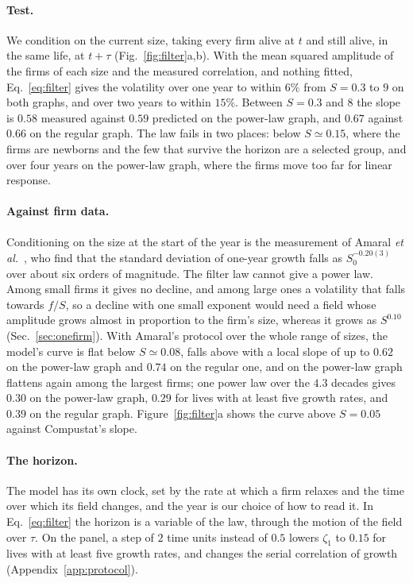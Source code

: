 \documentclass[pre,twocolumn,superscriptaddress,nofootinbib]{revtex4-2}
\begin{document}
\paragraph{Test.}  We condition on the current size, taking every firm alive at $t$ and still alive, in the same
life, at $t+\tau$ (Fig.~\ref{fig:filter}a,b).  With the mean squared amplitude of the firms of each size and the
measured correlation, and nothing fitted, Eq.~\eqref{eq:filter} gives the volatility over one year to within $6\%$
from $S=0.3$ to $9$ on both graphs, and over two years to within $15\%$.  Between $S=0.3$ and $8$ the slope is $0.58$
measured against $0.59$ predicted on the power-law graph, and $0.67$ against $0.66$ on the regular graph.  The law
fails in two places: below $S\simeq0.15$, where the firms are newborns and the few that survive the horizon are a
selected group, and over four years on the power-law graph, where the firms move too far for linear response.

\paragraph{Against firm data.}  Conditioning on the size at the start of the year is the measurement of Amaral
\emph{et al.}\ \cite{amaral1997}, who find that the standard deviation of one-year growth falls as $S_0^{-0.20(3)}$
over about six orders of magnitude.  The filter law cannot give a power law.  Among small firms it gives no decline,
and among large ones a volatility that falls towards $f/S$, so a decline with one small exponent would need a field
whose amplitude grows almost in proportion to the firm's size, whereas it grows as $S^{0.10}$
(Sec.~\ref{sec:onefirm}).  With Amaral's protocol over the whole range of sizes, the model's curve is flat below
$S\simeq0.08$, falls above with a local slope of up to $0.62$ on the power-law graph and $0.74$ on the regular one,
and on the power-law graph flattens again among the largest firms; one power law over the $4.3$ decades gives $0.30$ on the power-law graph, $0.29$ for lives with at
least five growth rates, and $0.39$ on the regular graph.  Figure~\ref{fig:filter}a shows the curve above
$S=0.05$ against Compustat's slope.

\paragraph{The horizon.}  The model has its own clock, set by the rate at which a firm relaxes and the time over
which its field changes, and the year is our choice of how to read it.  In Eq.~\eqref{eq:filter} the horizon is a
variable of the law, through the motion of the field over $\tau$.  On the panel, a step of $2$ time units instead of
$0.5$ lowers $\zeta_1$ to $0.15$ for lives with at least five growth rates, and changes the serial correlation of
growth (Appendix~\ref{app:protocol}).
\end{document}
